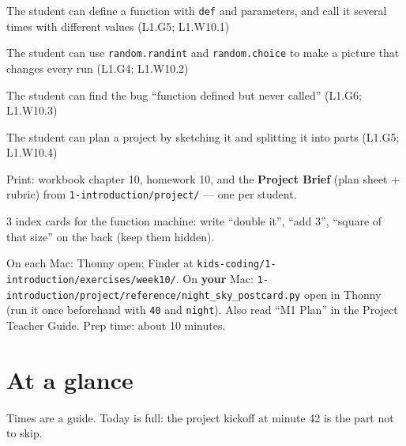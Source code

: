 
\begin{objectives}
  \item The student can define a function with \texttt{def} and parameters, and call it several times with different values (L1.G5; L1.W10.1)
  \item The student can use \texttt{random.randint} and \texttt{random.choice} to make a picture that changes every run (L1.G4; L1.W10.2)
  \item The student can find the bug \enquote{function defined but never called} (L1.G6; L1.W10.3)
  \item The student can plan a project by sketching it and splitting it into parts (L1.G5; L1.W10.4)
\end{objectives}

\begin{materials}
  \item Print: workbook chapter 10, homework 10, and the \textbf{Project Brief} (plan sheet + rubric) from \texttt{1-introduction/project/} --- one per student.
  \item 3 index cards for the function machine: write \enquote{double it}, \enquote{add 3}, \enquote{square of that size} on the back (keep them hidden).
  \item On each Mac: Thonny open; Finder at \texttt{kids-coding/1-introduction/exercises/week10/}. On \textbf{your} Mac: \texttt{1-introduction/project/reference/night\_sky\_postcard.py} open in Thonny (run it once beforehand with \texttt{40} and \texttt{night}). Also read \enquote{M1 Plan} in the Project Teacher Guide. Prep time: about 10 minutes.
\end{materials}

\section{At a glance}
Times are a guide. Today is full: the project kickoff at minute 42 is the part not to skip.
\begin{timeplan}
\end{timeplan}

